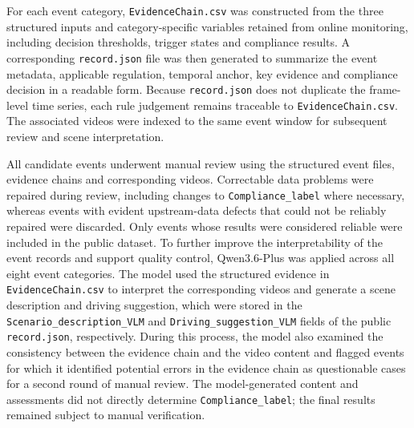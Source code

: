\documentclass[pdflatex,sn-mathphys-num]{sn-jnl}
\begin{document}
For each event category, \texttt{EvidenceChain.csv} was constructed from the three structured inputs and category-specific variables retained from online monitoring, including decision thresholds, trigger states and compliance results. A corresponding \texttt{record.json} file was then generated to summarize the event metadata, applicable regulation, temporal anchor, key evidence and compliance decision in a readable form. Because \texttt{record.json} does not duplicate the frame-level time series, each rule judgement remains traceable to \texttt{EvidenceChain.csv}. The associated videos were indexed to the same event window for subsequent review and scene interpretation.

All candidate events underwent manual review using the structured event files, evidence chains and corresponding videos. Correctable data problems were repaired during review, including changes to \texttt{Compliance\_label} where necessary, whereas events with evident upstream-data defects that could not be reliably repaired were discarded. Only events whose results were considered reliable were included in the public dataset. To further improve the interpretability of the event records and support quality control, Qwen3.6-Plus was applied across all eight event categories. The model used the structured evidence in \texttt{EvidenceChain.csv} to interpret the corresponding videos and generate a scene description and driving suggestion, which were stored in the \texttt{Scenario\_description\_VLM} and \texttt{Driving\_suggestion\_VLM} fields of the public \texttt{record.json}, respectively. During this process, the model also examined the consistency between the evidence chain and the video content and flagged events for which it identified potential errors in the evidence chain as questionable cases for a second round of manual review. The model-generated content and assessments did not directly determine \texttt{Compliance\_label}; the final results remained subject to manual verification.
\end{document}
